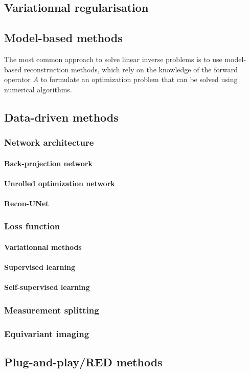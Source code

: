 \subsection{Variationnal regularisation}








\subsection{Model-based methods}

The most common approach to solve linear inverse problems is to use model-based reconstruction methods, which rely on the knowledge of the forward operator $A$ to formulate an optimization problem that can be solved using numerical algorithms.

\subsection{Data-driven methods}

\subsubsection{Network architecture}

\paragraph{Back-projection network}
\paragraph{Unrolled optimization network}
\paragraph{Recon-UNet}

\subsubsection{Loss function}

\paragraph{Variationnal methods}
\paragraph{Supervised learning}
\paragraph{Self-supervised learning}

\subsubsection{Measurement splitting}

\subsubsection{Equivariant imaging}

\subsection{Plug-and-play/RED methods}